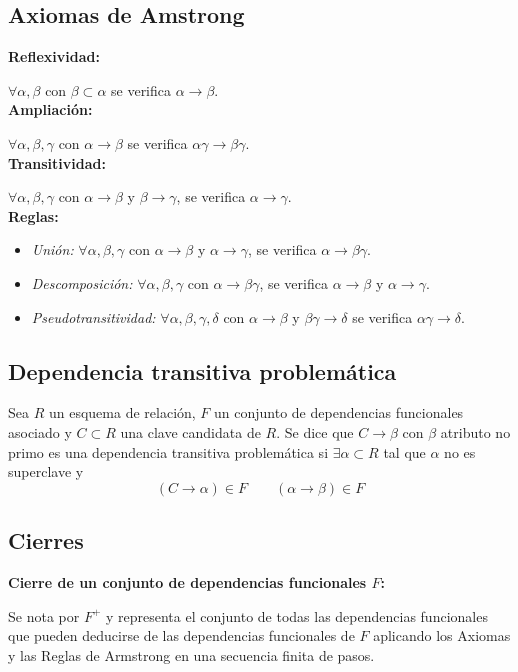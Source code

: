 \documentclass[12pt,a4paper]{article}
\theoremstyle{ejemplo}
\theoremstyle{algoritmo}
\begin{document}
\subsection*{Axiomas de Amstrong}

\textbf{Reflexividad:} 

$\forall\alpha,\beta$ con $\beta\subset\alpha$ se verifica $\alpha\to\beta$.
\\

\textbf{Ampliación:}

$\forall\alpha,\beta,\gamma$ con $\alpha\to\beta$ se verifica $\alpha\gamma
\to\beta\gamma$.
\\

\textbf{Transitividad:}

$\forall\alpha,\beta,\gamma$ con $\alpha\to\beta$ y $\beta\to\gamma$, se verifica
$\alpha\to\gamma$.
\\

\textbf{Reglas:}
\begin{itemize}
	\item \textit{Unión:} $\forall\alpha,\beta,\gamma$ con $\alpha\to\beta$ y 
	$\alpha\to\gamma$, se verifica $\alpha\to\beta\gamma$.
	\item \textit{Descomposición:} $\forall\alpha,\beta,\gamma$ con $\alpha\to
	\beta\gamma$, se verifica $\alpha\to\beta$ y $\alpha\to\gamma$.
	\item \textit{Pseudotransitividad:} $\forall\alpha,\beta,\gamma,\delta$ con
	$\alpha\to\beta$ y $\beta\gamma\to\delta$ se verifica $\alpha\gamma\to\delta$.
\end{itemize}

\subsection*{Dependencia transitiva problemática}
Sea $R$ un esquema de relación, $F$ un conjunto de dependencias funcionales
asociado y $C\subset R$ una clave candidata de $R$. Se dice que $C\to\beta$ con
$\beta$ atributo no primo es una dependencia transitiva problemática si $
\exists\alpha\subset R$ tal que $\alpha$ no es superclave y 
$$(C\to\alpha)\in F\quad\quad(\alpha\to\beta)\in F$$

\subsection*{Cierres}

\textbf{Cierre de un conjunto de dependencias funcionales $F$:}

Se nota por $F^+$ y representa el conjunto de todas las dependencias 
funcionales que pueden deducirse de las dependencias funcionales de $F$ 
aplicando los Axiomas y las Reglas de Armstrong en una secuencia finita de pasos.
\\
\end{document}
